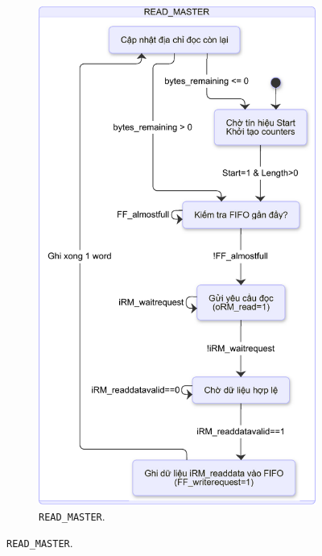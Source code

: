 \begin{figure}[htbp]
    \centering
    \begin{subfigure}[b]{0.48\textwidth}
        \centering
        \includegraphics[width=\linewidth]{Images/02_12_StateDiagram_ReadMaster.pdf}
        \caption{\texttt{READ\_MASTER}.}
        \label{fig:02_12_StateDiagram_ReadMaster}
    \end{subfigure}
    \hfill %

\end{figure}
